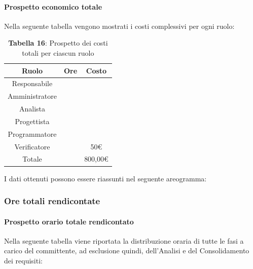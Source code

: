 \paragraph{Prospetto economico totale}
Nella seguente tabella vengono mostrati i costi complessivi per ogni ruolo:

\begin{table}[H]
	\centering
	\renewcommand{\arraystretch}{1.5}
	\begin{tabular}{|c|c|c|}
		\hline
		\rowcolor{lighter-grayer}
		Ruolo & Ore & Costo \\
		\hline
		Responsabile &  &  \\
		\hline
		Amministratore &  &  \\
		\hline
		Analista &  &  \\
		\hline
		Progettista&  &  \\
		\hline
		Programmatore &  &  \\
		\hline
		Verificatore &  & 50\euro \\
		\hline
		Totale &  &  800,00\euro \\
		\hline
	\end{tabular}
	\caption*{\textbf{Tabella 16}: Prospetto dei costi totali per ciascun ruolo \\}
\end{table}

I dati ottenuti possono essere riassunti nel seguente areogramma:



\subsubsection{Ore totali rendicontate}
\paragraph{Prospetto orario totale rendicontato}
Nella seguente tabella viene riportata la distribuzione oraria di tutte le fasi a carico del committente, ad esclusione quindi, dell'Analisi e del Consolidamento dei requisiti:

